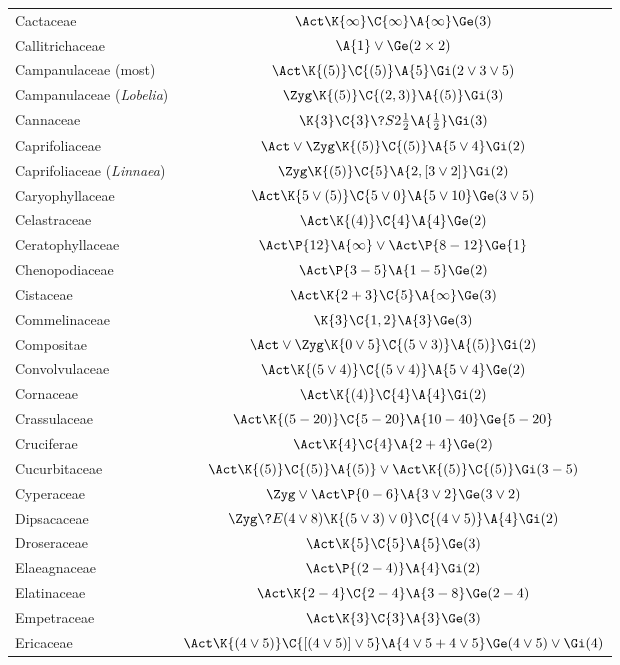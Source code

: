 ﻿\documentclass[12pt]{article}
\begin{document}
\begin{longtable}{lc}
Cactaceae & $\Act\K{\infty}\C{\infty}\A{\infty}\Ge(3)$\\[2pt]
Callitrichaceae & $\A{1}\vee\Ge(2\times2)$\\[2pt]
Campanulaceae (most) & $\Act\K{(5)}\C{(5)}\A{5}\Gi(2\vee3\vee5)$\\[2pt]
Campanulaceae (\textit{Lobelia}) & $\Zyg\K{(5)}\C{(2,3)}\A{(5)}\Gi(3)$\\[2pt]
Cannaceae & $\K{3}\C{3}\?{S}{2\frac{1}{2}}\A{\frac{1}{2}}\Gi(3)$\\[2pt]
Caprifoliaceae & $\Act\vee\Zyg\K{(5)}\C{(5)}\A{5\vee4}\Gi(2)$\\[2pt]
Caprifoliaceae (\textit{Linnaea}) & $\Zyg\K{(5)}\C{5}\A{2,[3\vee2]}\Gi(2)$\\[2pt]
Caryophyllaceae & $\Act\K{5\vee(5)}\C{5\vee0}\A{5\vee10}\Ge(3\vee5)$\\[2pt]
Celastraceae & $\Act\K{(4)}\C{4}\A{4}\Ge(2)$\\[2pt]
Ceratophyllaceae & $\Act\P{12}\A{\infty}\vee\Act\P{8-12}\Ge{1}$\\[2pt]
Chenopodiaceae & $\Act\P{3-5}\A{1-5}\Ge(2)$\\[2pt]
Cistaceae & $\Act\K{2+3}\C{5}\A{\infty}\Ge(3)$\\[2pt]
Commelinaceae & $\K{3}\C{1,2}\A{3}\Ge(3)$\\[2pt]
Compositae & $\Act\vee\Zyg\K{0\vee5}\C{(5\vee3)}\A{(5)}\Gi(2)$\\[2pt]
Convolvulaceae & $\Act\K{(5\vee4)}\C{(5\vee4)}\A{5\vee4}\Ge(2)$\\[2pt]
Cornaceae & $\Act\K{(4)}\C{4}\A{4}\Gi(2)$\\[2pt]
Crassulaceae & $\Act\K{(5-20)}\C{5-20}\A{10-40}\Ge{5-20}$\\[2pt]
Cruciferae & $\Act\K{4}\C{4}\A{2+4}\Ge(2)$\\[2pt]
Cucurbitaceae & $\Act\K{(5)}\C{(5)}\A{(5)}\vee\Act\K{(5)}\C{(5)}\Gi(3-5)$\\[2pt]
Cyperaceae & $\Zyg\vee\Act\P{0-6}\A{3\vee2}\Ge(3\vee2)$\\[2pt]
Dipsacaceae & $\Zyg\?{E}{(4\vee8)}\K{(5\vee3)\vee0}\C{(4\vee5)}\A{4}\Gi(2)$\\[2pt]
Droseraceae & $\Act\K{5}\C{5}\A{5}\Ge(3)$\\[2pt]
Elaeagnaceae & $\Act\P{(2-4)}\A{4}\Gi(2)$\\[2pt]
Elatinaceae & $\Act\K{2-4}\C{2-4}\A{3-8}\Ge(2-4)$\\[2pt]
Empetraceae & $\Act\K{3}\C{3}\A{3}\Ge(3)$\\[2pt]
Ericaceae & $\Act\K{(4\vee5)}\C{[(4\vee5)]\vee5}\A{4\vee5+4\vee5}\Ge(4\vee5)\vee\Gi(4)$\\[2pt]

\end{longtable}
\end{document}
